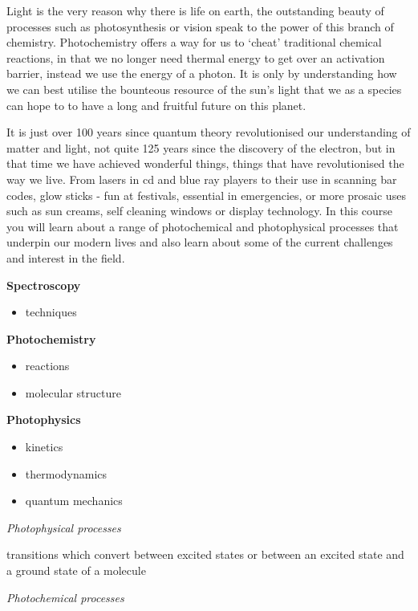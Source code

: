 \documentclass[
]{book}
\providecommand{\tightlist}{%
  \setlength{\itemsep}{0pt}\setlength{\parskip}{0pt}}
\begin{document}
Light is the very reason why there is life on earth, the outstanding beauty of processes such as photosynthesis or vision speak to the power of this branch of chemistry. Photochemistry offers a way for us to `cheat' traditional chemical reactions, in that we no longer need thermal energy to get over an activation barrier, instead we use the energy of a photon. It is only by understanding how we can best utilise the bounteous resource of the sun's light that we as a species can hope to to have a long and fruitful future on this planet.

It is just over 100 years since quantum theory revolutionised our understanding of matter and light, not quite 125 years since the discovery of the electron, but in that time we have achieved wonderful things, things that have revolutionised the way we live. From lasers in cd and blue ray players to their use in scanning bar codes, glow sticks - fun at festivals, essential in emergencies, or more prosaic uses such as sun creams, self cleaning windows or display technology. In this course you will learn about a range of photochemical and photophysical processes that underpin our modern lives and also learn about some of the current challenges and interest in the field.

\textbf{Spectroscopy}

\begin{itemize}
\tightlist
\item
  techniques
\end{itemize}

\textbf{Photochemistry}

\begin{itemize}
\tightlist
\item
  reactions
\item
  molecular structure
\end{itemize}

\textbf{Photophysics}

\begin{itemize}
\tightlist
\item
  kinetics
\item
  thermodynamics
\item
  quantum mechanics
\end{itemize}

\emph{Photophysical processes}

transitions which convert between excited states or between an excited state and a ground state of a molecule

\emph{Photochemical processes}
\end{document}
